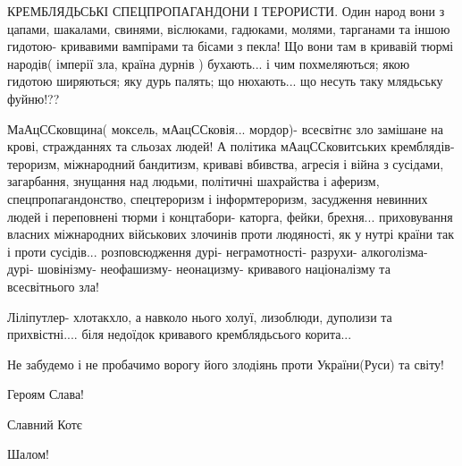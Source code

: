 КРЕМБЛЯДЬСЬКІ СПЕЦПРОПАГАНДОНИ І ТЕРОРИСТИ. Один народ вони з цапами, шакалами,
свинями, віслюками, гадюками, молями, тарганами та іншою гидотою- кривавими
вампірами та бісами з пекла! Що вони там в кривавій тюрмі народів( імперії зла,
країна дурнів ) бухають... і чим похмеляються; якою гидотою ширяються; яку дурь
палять; що нюхають... що несуть таку млядьську фуйню!??

МаАцССковщина( моксель, мАацССковія... мордор)- всесвітнє зло замішане на крові,
стражданнях та сльозах людей! А політика мАацССковитських кремблядів- тероризм,
міжнародний бандитизм, криваві вбивства, агресія і війна з сусідами,
загарбання, знущання над людьми, політичні шахрайства і аферизм,
спецпропагандонство, спецтероризм і інформтероризм, засудження невинних людей і
переповнені тюрми і концтабори- каторга, фейки, брехня... приховування власних
міжнародних військових злочинів проти людяності, як у нутрі країни так і проти
сусідів... розповсюдження дурі- неграмотності- разрухи- алкоголізма- дурі-
шовінізму- неофашизму- неонацизму- кривавого націоналізму та всесвітнього зла!

Ліліпутлер- хлотакхло, а навколо нього холуї, лизоблюди, дуполизи та
прихвістні.... біля недоїдок кривавого кремблядьсього корита...

Не забудемо і не пробачимо ворогу його злодіянь проти України(Руси) та світу!

 
Героям Слава!

 
Славний Котє

 
Шалом!

 

